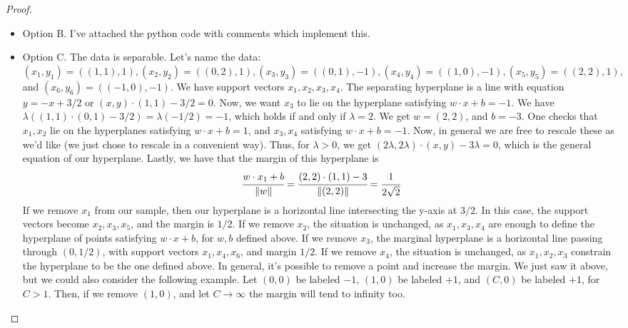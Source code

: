 \documentclass[12pt]{article}
\newcommand{\norm}[1]{\lVert #1 \rVert}
\begin{document}
\begin{proof}
  \begin{itemize}
  \item
    Option B. I've attached the python code with comments which implement this.
  \item
    Option C. The data is separable. Let's name the data: $(x_1,y_1) = ((1,1),1), (x_2, y_2) = ((0,2),1), (x_3,y_3) = ((0,1), -1), (x_4,y_4) =  ((1,0), -1), (x_5,y_5) = ((2,2),1), $ and $ (x_6,y_6) = ((-1,0), -1)$.
    We have support vectors $x_1, x_2, x_3, x_4$. The separating hyperplane is a line with equation $y=-x+3/2$ or $(x,y) \cdot (1,1) - 3/2 = 0 $. Now, we want $x_3$ to lie on the hyperplane
    satisfying $w \cdot x + b = -1$. We have $\lambda((1,1) \cdot (0,1) - 3/2) = \lambda ( - 1/2) = -1$, which holds if and only if $\lambda = 2$. We get $w = (2,2)$, and $b = -3$. One checks that $x_1, x_2$ lie on the hyperplanes satisfying
    $w \cdot x + b = 1$, and $x_3, x_4$ satisfying $w \cdot x + b = -1$. Now, in general we are free to rescale these as we'd like (we just chose to rescale in a convenient way).
    Thus, for $\lambda > 0$, we get $ (2\lambda, 2\lambda) \cdot (x,y) - 3 \lambda = 0$, which is the general equation of our hyperplane. Lastly, we have that the margin of this hyperplane is
    \begin{align*}
      \cfrac{w \cdot x_1 + b}{\norm{w}} = \cfrac{(2,2) \cdot (1,1) - 3}{\norm{(2,2)}} = \cfrac{1}{2\sqrt{2}} 
    \end{align*}
    If we remove $x_1$ from our sample, then our hyperplane is a horizontal line intersecting the y-axis at $3/2$. In this case,
    the support vectors become $x_2, x_3, x_5$, and the margin is $1/2$. If we remove $x_2$, the situation is unchanged, as $x_1, x_3, x_4$ are enough to define the hyperplane of points satisfying $w \cdot x + b$, for $w, b$ defined above. If we remove $x_3$, the marginal hyperplane is a horizontal line passing through $(0, 1/2)$, with support vectors $x_1, x_4, x_6 $, and margin $1/2$. If we remove $x_4$, the situation is unchanged, as $x_1, x_2, x_3$ constrain the hyperplane to be the one defined above. In general, it's possible to remove a point and increase the margin. We just saw it above, but we could also consider the following example. Let $(0,0)$ be labeled $-1$, $(1,0)$ be labeled $+1$, and $(C,0)$ be labeled $+1$, for $C>1$. Then, if we remove $(1,0)$, and let $C \to \infty$ the margin will tend to infinity too.


  \end{itemize}
\end{proof}
\end{document}
